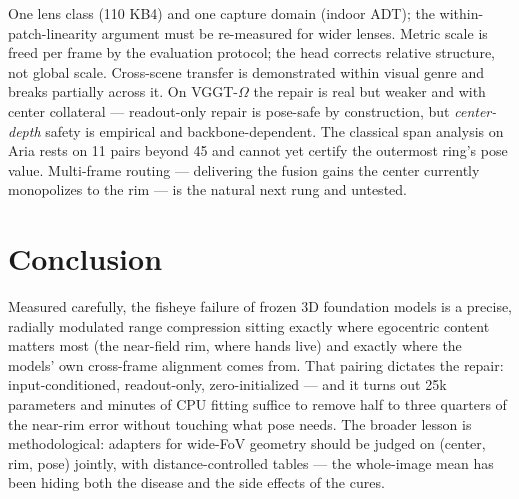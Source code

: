 \documentclass{article}
\begin{document}
One lens class (110\textdegree{} KB4) and one capture domain (indoor ADT);
the within-patch-linearity argument must be re-measured for wider lenses.
Metric scale is freed per frame by the evaluation protocol; the head corrects
relative structure, not global scale. Cross-scene transfer is demonstrated
within visual genre and breaks partially across it. On VGGT-$\Omega$ the
repair is real but weaker and with center collateral --- readout-only repair
is pose-safe by construction, but \emph{center-depth} safety is empirical
and backbone-dependent. The classical span analysis on Aria rests on 11
pairs beyond 45\textdegree{} and cannot yet certify the outermost ring's
pose value. Multi-frame routing --- delivering the fusion gains the center
currently monopolizes to the rim --- is the natural next rung and untested.

\section{Conclusion}

Measured carefully, the fisheye failure of frozen 3D foundation models is a
precise, radially modulated range compression sitting exactly where
egocentric content matters most (the near-field rim, where hands live) and
exactly where the models' own cross-frame alignment comes from. That pairing
dictates the repair: input-conditioned, readout-only, zero-initialized ---
and it turns out 25k parameters and minutes of CPU fitting suffice to remove
half to three quarters of the near-rim error without touching what pose
needs. The broader lesson is methodological: adapters for wide-FoV geometry
should be judged on (center, rim, pose) jointly, with distance-controlled
tables --- the whole-image mean has been hiding both the disease and the side
effects of the cures.
\end{document}
